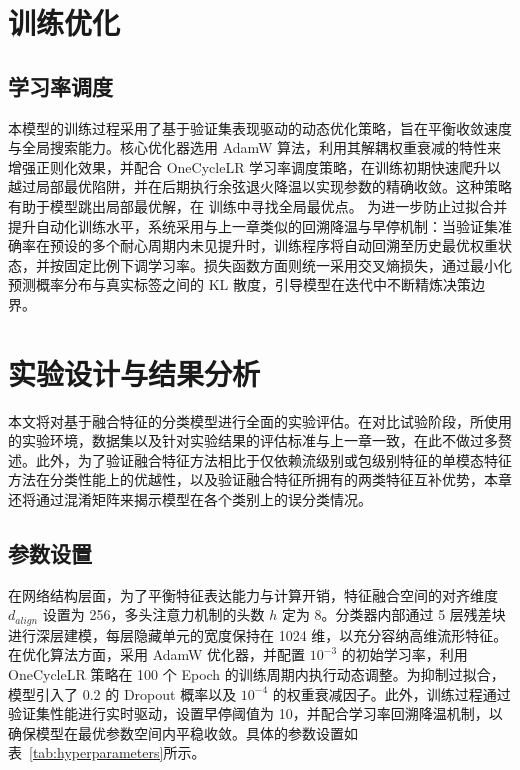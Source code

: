 \section{训练优化}

\subsection{学习率调度}
本模型的训练过程采用了基于验证集表现驱动的动态优化策略，旨在平衡收敛速度与全局搜索能力。核心优化器选用 AdamW 算法，利用其解耦权重衰减的特性来增强正则化效果，并配合 OneCycleLR 学习率调度策略，在训练初期快速爬升以越过局部最优陷阱，并在后期执行余弦退火降温以实现参数的精确收敛。这种策略有助于模型跳出局部最优解，在 训练中寻找全局最优点。
为进一步防止过拟合并提升自动化训练水平，系统采用与上一章类似的回溯降温与早停机制：当验证集准确率在预设的多个耐心周期内未见提升时，训练程序将自动回溯至历史最优权重状态，并按固定比例下调学习率。损失函数方面则统一采用交叉熵损失，通过最小化预测概率分布与真实标签之间的 KL 散度，引导模型在迭代中不断精炼决策边界。

\section{实验设计与结果分析}
本文将对基于融合特征的分类模型进行全面的实验评估。在对比试验阶段，所使用的实验环境，数据集以及针对实验结果的评估标准与上一章一致，在此不做过多赘述。此外，为了验证融合特征方法相比于仅依赖流级别或包级别特征的单模态特征方法在分类性能上的优越性，以及验证融合特征所拥有的两类特征互补优势，本章还将通过混淆矩阵来揭示模型在各个类别上的误分类情况。

\subsection{参数设置}
在网络结构层面，为了平衡特征表达能力与计算开销，特征融合空间的对齐维度 $d_{align}$ 设置为 256，多头注意力机制的头数 $h$ 定为 8。分类器内部通过 5 层残差块进行深层建模，每层隐藏单元的宽度保持在 1024 维，以充分容纳高维流形特征。在优化算法方面，采用 AdamW 优化器，并配置 $10^{-3}$ 的初始学习率，利用 OneCycleLR 策略在 100 个 Epoch 的训练周期内执行动态调整。为抑制过拟合，模型引入了 0.2 的 Dropout 概率以及 $10^{-4}$ 的权重衰减因子。此外，训练过程通过验证集性能进行实时驱动，设置早停阈值为 10，并配合学习率回溯降温机制，以确保模型在最优参数空间内平稳收敛。具体的参数设置如表~\ref{tab:hyperparameters}所示。

